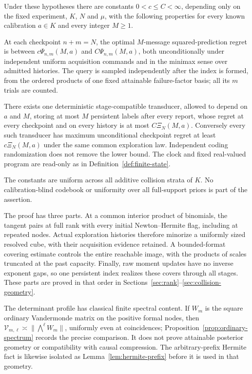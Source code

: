 \begin{theorem}\label{thm:resolution-main}
Under these hypotheses there are constants $0<c\le C<\infty$,
depending only on the fixed experiment, $K$, $N$ and $\mu$, with the
following properties for every known calibration $a\in K$ and every
integer $M\ge1$.

At each checkpoint $n+m=N$, the optimal $M$-message squared-prediction
regret is between $c\Psi_{n,m}(M,a)$ and $C\Psi_{n,m}(M,a)$,
both unconditionally under independent uniform acquisition commands and
in the minimax sense over admitted histories. The query is sampled
independently after the index is formed, from the ordered products of
one fixed attainable failure-factor basis; all its $m$ trials are counted.

There exists one deterministic stage-compatible transducer, allowed to
depend on $a$ and $M$, storing at most $M$ persistent labels after
every report, whose regret at every checkpoint and on every history is
at most $C\Xi_N(M,a)$. Conversely every such transducer has maximum
unconditional checkpoint regret at least $c\Xi_N(M,a)$ under the
same common exploration law. Independent coding randomization does not
remove the lower bound. The clock and fixed real-valued program are
read-only as in Definition~\ref{def:finite-state}.

The constants are uniform across all additive collision strata of $K$.
No calibration-blind codebook or uniformity over all full-support priors
is part of the assertion.
\end{theorem}

The proof has three parts. At a common interior product of binomials,
the tangent pairs at full rank with every initial Newton--Hermite flag,
including at repeated nodes. Actual exploration histories therefore
minorize a uniformly sized resolved cube, with their acquisition evidence
retained. A bounded-format covering estimate controls the entire reachable
image, with the products of scales truncated at the past capacity.
Finally, raw moment updates have no inverse exponent gaps, so one
persistent index realizes these covers through all stages. These parts
are proved in that order in Sections~\ref{sec:rank}--\ref{sec:collision-geometry}.

The determinant profile has classical finite spectral content. If $W_m$
is the square ordinary Vandermonde matrix on the positive formal nodes,
then $\mathcal V_{m,\ell}\asymp\|\bigwedge^\ell W_m\|$,
uniformly even at coincidences; Proposition~\ref{prop:ordinary-spectrum}
records the precise comparison. It does not prove attainable posterior
geometry or compatibility with causal compression. The arbitrary-prefix
Hermite fact is likewise isolated as Lemma~\ref{lem:hermite-prefix}
before it is used in that geometry.

